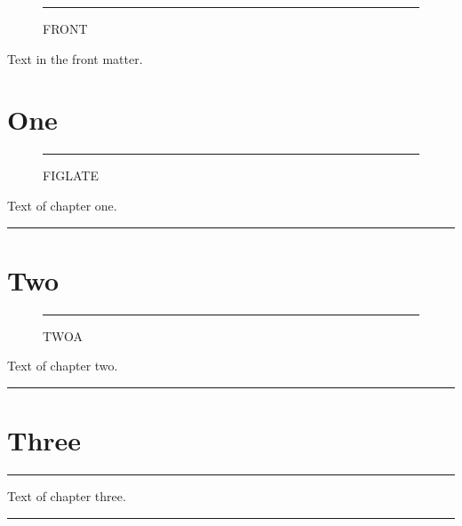 \documentclass[a4paper]{memoir}
\begin{document}
\frontmatter
\begin{figure}[h]
  \centering\rule{2cm}{5mm}\caption{FRONT}
\end{figure}
Text in the front matter.
\clearpage
\mainmatter
\chapter{One}
\begin{figure}[p]
  \centering\rule{4cm}{4cm}\caption{FIGLATE}
\end{figure}
Text of chapter one.
\begin{marginfigure}\rule{2cm}{5mm}\caption{EARLY}\end{marginfigure}
\lipsum[1]
\chapter{Two}
\begin{figure}[h]
  \centering\rule{2cm}{5mm}\caption{TWOA}
\end{figure}
Text of chapter two.
\begin{marginfigure}\rule{2cm}{5mm}\caption{TWOB}\end{marginfigure}
\chapter{Three}
\begin{table}[p]
  \centering\rule{4cm}{4cm}\caption{TABLELATE}
\end{table}
Text of chapter three.
\begin{marginfigure}\rule{2cm}{5mm}\caption{TABMARGIN}\end{marginfigure}
\lipsum[2]
\end{document}
